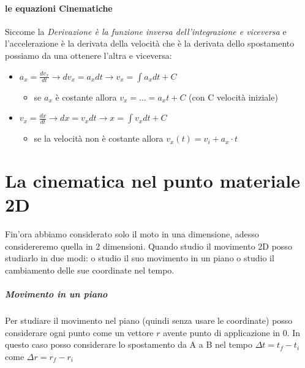 \documentclass[12pt, a4paper, openany]{book}
\begin{document}
\paragraph*{le equazioni Cinematiche}
Siccome la \emph{Derivazione è la funzione inversa dell'integrazione e viceversa} e l'accelerazione è la derivata della velocità che è la derivata dello spostamento
possiamo da una ottenere l'altra e viceversa:
\begin{itemize} %
    \item $a_x = \frac{dv_x}{dt} \to dv_x = a_xdt \to v_x = \int a_x dt + C$
    \begin{itemize}
        \item se $a_x$ è costante allora $v_x = ... = a_x t + C$ (con C velocità iniziale)
    \end{itemize}
    \item $v_x = \frac{dx}{dt} \to dx = v_xdt \to x = \int v_xdt + C$
    \begin{itemize}
        \item se la velocità non è costante allora $v_x(t) = v_i + a_x \cdot t$ 
    \end{itemize}
\end{itemize}
\section*{La cinematica nel punto materiale 2D}
Fin'ora abbiamo considerato solo il moto in una dimensione, adesso considereremo quella in 2 dimensioni.
Quando studio il movimento 2D posso studiarlo in due modi: o studio il suo movimento in un piano o studio il cambiamento delle sue coordinate nel tempo.
\subparagraph*{Movimento in un piano} Per studiare il movimento nel piano (quindi senza usare le coordinate) posso considerare ogni 
punto come un vettore $r$ avente punto di applicazione in 0.
In questo caso posso considerare lo spostamento da A a B nel tempo $\Delta t = t_f-t_i$ come $\Delta r = r_f-r_i$
\end{document}
